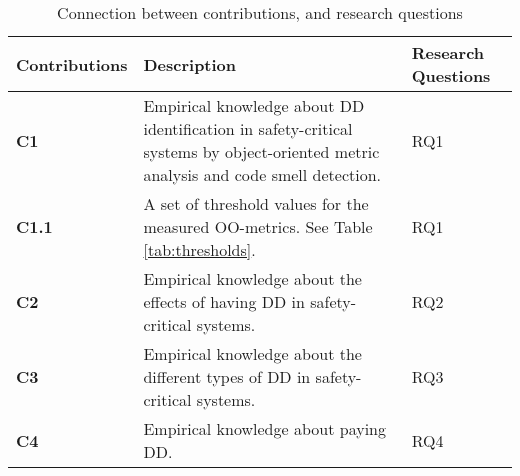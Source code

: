 \begin{table}[ht!]
\centering
\caption{Connection between contributions, and research questions}
\label{tab:conribution}
\begin{tabular}{|l|p{6cm}|l|}
\hline
\textbf{Contributions} & \textbf{Description}                                                                                                               & \textbf{Research Questions} \\ \hline
\textbf{C1}            & Empirical knowledge about DD identification in safety-critical systems by object-oriented metric analysis and code smell detection. & RQ1                         \\ \hline
\textbf{C1.1}          & A set of threshold values for the measured OO-metrics. See Table \ref{tab:thresholds}.                                                                 & RQ1                         \\ \hline
\textbf{C2}            & Empirical knowledge about the effects of having DD in safety-critical systems.                                                      & RQ2                         \\ \hline
\textbf{C3}            & Empirical knowledge about the different types of DD in safety-critical systems.                                                     & RQ3                         \\ \hline
\textbf{C4}                     & Empirical knowledge about paying DD.                                                                                                & RQ4                         \\ \hline
\end{tabular}
\end{table}






